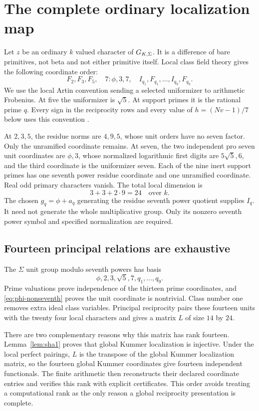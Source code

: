 \section{The complete ordinary localization map}\label{sec:localization}
Let $z$ be an ordinary $k$ valued character of $G_{K,\Sigma}$. It is a difference of bare primitives, not beta and not either primitive itself. Local class field theory gives the following coordinate order:
\begin{equation}\label{eq:localcoords}
F_2,F_3,F_5,\quad7:\phi,3,7,\quad
I_{q_1},F_{q_1},\ldots,I_{q_9},F_{q_9}.
\end{equation}
We use the local Artin convention sending a selected uniformizer to arithmetic Frobenius. At five the uniformizer is $\sqrt5$. At support primes it is the rational prime $q$. Every sign in the reciprocity rows and every value of $h=(Nv-1)/7$ below uses this convention \cite{milneCFT2020}.

At $2,3,5$, the residue norms are $4,9,5$, whose unit orders have no seven factor. Only the unramified coordinate remains. At seven, the two independent pro seven unit coordinates are $\phi,3$, whose normalized logarithmic first digits are $5\sqrt5,6$, and the third coordinate is the uniformizer seven. Each of the nine inert support primes has one seventh power residue coordinate and one unramified coordinate. Real odd primary characters vanish. The total local dimension is
\[
3+3+2\cdot9=24\quad\text{over }k.
\]
The chosen $g_q=\phi+a_q$ generating the residue seventh power quotient supplies $I_q$. It need not generate the whole multiplicative group. Only its nonzero seventh power symbol and specified normalization are required.

\subsection{Fourteen principal relations are exhaustive}
The $\Sigma$ unit group modulo seventh powers has basis
\begin{equation}\label{eq:sigmabasis}
\phi,2,3,\sqrt5,7,q_1,\ldots,q_9.
\end{equation}
Prime valuations prove independence of the thirteen prime coordinates, and \eqref{eq:phi-nonseventh} proves the unit coordinate is nontrivial. Class number one removes extra ideal class variables. Principal reciprocity pairs these fourteen units with the twenty four local characters and gives a matrix $L$ of size $14$ by $24$.

There are two complementary reasons why this matrix has rank fourteen. Lemma~\ref{lem:sha1} proves that global Kummer localization is injective. Under the local perfect pairings, $L$ is the transpose of the global Kummer localization matrix, so the fourteen global Kummer coordinates give fourteen independent functionals. The finite arithmetic then reconstructs their declared coordinate entries and verifies this rank with explicit certificates. This order avoids treating a computational rank as the only reason a global reciprocity presentation is complete.

